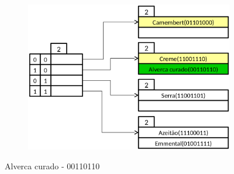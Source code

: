 \begin{figure}[H]
	\begin{center}
	\begin{subfigure}[b]{0.5\textwidth}
		\centering
		\includegraphics[width=\textwidth]{fig7.png}

	\end{subfigure}
	\caption{Alverca curado - 00110110}
	\end{center}
\end{figure}